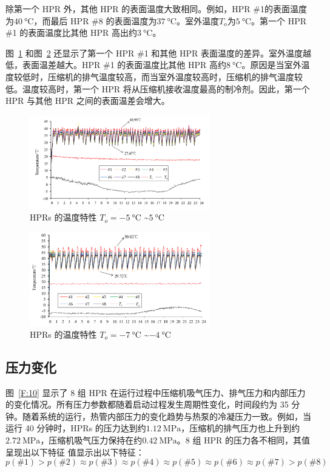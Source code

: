 除第一个 HPR 外，其他 HPR 的表面温度大致相同。例如，HPR \#1的表面温度为$\qty{40}{\degreeCelsius} $，而最后 HPR \#8 的表面温度为$\qty{37}{\degreeCelsius} $。室外温度$T_o$为$\qty{5}{\degreeCelsius} $。第一个 HPR \#1 的表面温度比其他 HPR 高出约$\qty{3}{\degreeCelsius} $。

图~\ref{F:8} 和图~\ref{F:9} 还显示了第一个 HPR \#1 和其他 HPR 表面温度的差异。室外温度越低，表面温差越大。HPR \#1 的表面温度比其他 HPR 高约$\qty{8}{\degreeCelsius} $。原因是当室外温度较低时，压缩机的排气温度较高，而当室外温度较高时，压缩机的排气温度较低。温度较高时，第一个 HPR 将从压缩机接收温度最高的制冷剂。因此，第一个 HPR 与其他 HPR 之间的表面温差会增大。

\begin{figure}[htbp]
	\centering
	\includegraphics[width=0.7\textwidth]{picture/picture_8}
	\caption{HPRs 的温度特性 $T_o = \qty{-5}{\degreeCelsius}$ \textasciitilde $\qty{5}{\degreeCelsius}$}
	\label{F:8}
\end{figure}

\begin{figure}[htbp]
	\centering
	\includegraphics[width=0.7\textwidth]{picture/picture_9}
\caption{HPRs 的温度特性 $T_o = \qty{-7}{\degreeCelsius}$ \textasciitilde $\qty{-4}{\degreeCelsius}$}
	\label{F:9}
\end{figure}

\subsection{压力变化}
图~\ref{F:10} 显示了 8 组 HPR 在运行过程中压缩机吸气压力、排气压力和内部压力的变化情况。所有压力参数都随着启动过程发生周期性变化，时间段约为 35 分钟。随着系统的运行，热管内部压力的变化趋势与热泵的冷凝压力一致。例如，当运行 40 分钟时，HPRs 的压力达到约$\qty{1.12}{\MPa} $，压缩机的排气压力也上升到约 $\qty{2.72}{\MPa} $，压缩机吸气压力保持在约$\qty{0.42}{\MPa} $。8 组 HPR 的压力各不相同，其值呈现出以下特征 值显示出以下特征：
 \[
 	p(\#1) > p(\#2) \approx p(\#3) \approx p(\#4) \approx p(\#5) \approx p(\#6) \approx p(\#7) > p(\#8)
 \]

